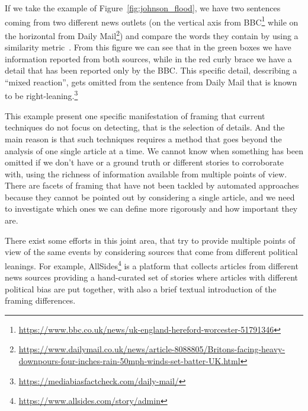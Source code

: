 If we take the example of Figure~\ref{fig:johnson_flood}, we have two sentences coming from two different news outlets (on the vertical axis from BBC\footnote{\url{https://www.bbc.co.uk/news/uk-england-hereford-worcester-51791346}} while on the horizontal from Daily Mail\footnote{\url{https://www.dailymail.co.uk/news/article-8088805/Britons-facing-heavy-downpours-four-inches-rain-50mph-winds-set-batter-UK.html}}) and compare the words they contain by using a similarity metric~\cite{cer2018universal}.
From this figure we can see that in the green boxes we have information reported from both sources, while in the red curly brace we have a detail that has been reported only by the BBC.
This specific detail, describing a ``mixed reaction'', gets omitted from the sentence from Daily Mail that is known to be right-leaning.\footnote{\url{https://mediabiasfactcheck.com/daily-mail/}}

This example present one specific manifestation of framing that current techniques do not focus on detecting, that is the selection of details.
And the main reason is that such techniques requires a method that goes beyond the analysis of one single article at a time.
We cannot know when something has been omitted if we don't have or a ground truth or different stories to corroborate with, using the richness of information available from multiple points of view.
There are facets of framing that have not been tackled by automated approaches because they cannot be pointed out by considering a single article, and we need to investigate which ones we can define more rigorously and how important they are.

There exist some efforts in this joint area, that try to provide multiple points of view of the same events by considering sources that come from different political leanings.
For example, AllSides\footnote{\url{https://www.allsides.com/story/admin}} is a platform that collects articles from different news sources providing a hand-curated set of stories where articles with different political bias are put together, with also a brief textual introduction of the framing differences.

